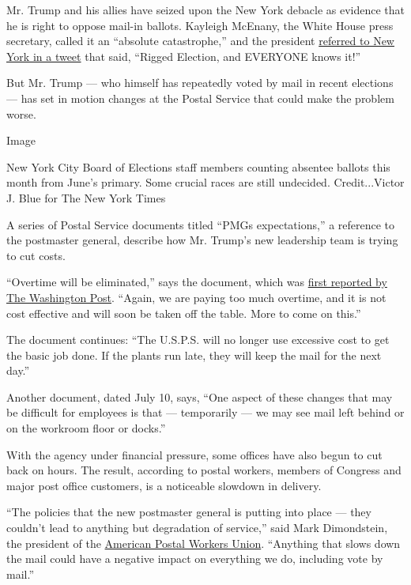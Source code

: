 Mr. Trump and his allies have seized upon the New York debacle as
evidence that he is right to oppose mail-in ballots. Kayleigh McEnany,
the White House press secretary, called it an ``absolute catastrophe,''
and the president
\href{https://twitter.com/realDonaldTrump/status/1287554056727040008?s=20}{referred
to New York in a tweet} that said, ``Rigged Election, and EVERYONE knows
it!''

But Mr. Trump --- who himself has repeatedly voted by mail in recent
elections --- has set in motion changes at the Postal Service that could
make the problem worse.

Image

New York City Board of Elections staff members counting absentee ballots
this month from June's primary. Some crucial races are still undecided.
Credit...Victor J. Blue for The New York Times

A series of Postal Service documents titled ``PMGs expectations,'' a
reference to the postmaster general, describe how Mr. Trump's new
leadership team is trying to cut costs.

``Overtime will be eliminated,'' says the document, which was
\href{https://www.washingtonpost.com/business/2020/07/14/postal-service-trump-dejoy-delay-mail/}{first
reported by The Washington Post}. ``Again, we are paying too much
overtime, and it is not cost effective and will soon be taken off the
table. More to come on this.''

The document continues: ``The U.S.P.S. will no longer use excessive cost
to get the basic job done. If the plants run late, they will keep the
mail for the next day.''

Another document, dated July 10, says, ``One aspect of these changes
that may be difficult for employees is that --- temporarily --- we may
see mail left behind or on the workroom floor or docks.''

With the agency under financial pressure, some offices have also begun
to cut back on hours. The result, according to postal workers, members
of Congress and major post office customers, is a noticeable slowdown in
delivery.

``The policies that the new postmaster general is putting into place ---
they couldn't lead to anything but degradation of service,'' said Mark
Dimondstein, the president of the
\href{https://www.apwu.org/mark-dimondstein}{American Postal Workers
Union}. ``Anything that slows down the mail could have a negative impact
on everything we do, including vote by mail.''

